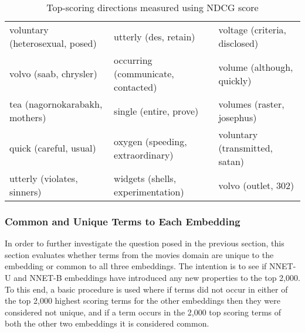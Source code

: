 \begin{table}[]
\begin{tabular}{lll}
		voluntary (heterosexual, posed)          & utterly (des, retain)                             & voltage (criteria, disclosed)                            \\
		volvo (saab, chrysler)                   & occurring (communicate, contacted)                & volume (although, quickly)                               \\
		tea (nagornokarabakh, mothers)           & single (entire, prove)                            & volumes (raster, josephus)                               \\
		quick (careful, usual)                   & oxygen (speeding, extraordinary)                  & voluntary (transmitted, satan)                           \\
		utterly (violates, sinners)              & widgets (shells, experimentation)                 & volvo (outlet, 302)                                     
	\end{tabular}\caption{Top-scoring directions measured using NDCG score}\label{ch5:topscores}
\end{table}

\subsubsection{Common and Unique Terms to Each Embedding}\label{ch5:commonunique}

In order to further investigate the question posed in the previous section, this section evaluates whether terms from the movies domain are unique to the embedding or common to all three embeddings. The intention is to see if NNET-U and NNET-B embeddings have introduced any new properties to the top 2,000. To this end,  a basic procedure is used  where if terms did not occur in either of the top 2,000 highest scoring terms for the other embeddings then they were considered not unique, and if a term  occurs in the 2,000 top scoring terms of both the other two embeddings it is considered common. 

